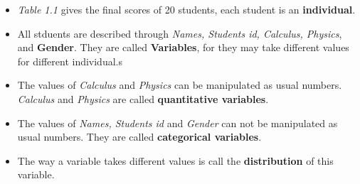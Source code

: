 \documentclass[a4paper, 12pt,twoside]{book}\usepackage[]{graphicx}\usepackage[]{color}
\begin{document}
\begin{itemize}
\item \textit{Table 1.1} gives the final scores of 20 students, each student is an \textbf{individual}. 
\item All stduents are described through  \textit{Names, Students id, Calculus, Physics}, and \textbf{Gender}. They are called \textbf{Variables}, for they may take different values for different individual.s

\item The values of \textit{Calculus} and \textit{Physics} can be manipulated as usual numbers. \textit{Calculus} and \textit{Physics} are called \textbf{quantitative variables}.

\item The values of \textit{Names, Students id} and \textit{Gender} can not be manipulated as usual numbers. They are called \textbf{categorical variables}.

\item The way a variable takes different values is call the \textbf{distribution} of this variable.

\end{itemize}
\end{document}
